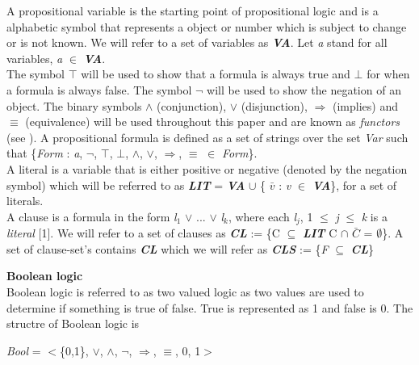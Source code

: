 \documentclass[11pt,a4paper]{report}
\begin{document}
A propositional variable is the starting point of propositional logic and is a alphabetic symbol that represents a object or number which is subject to change or is not known. We will refer to a set of variables as \textit{\textbf{VA}}. Let \textit{a} stand for all variables, \textit{a} $\in$ \textit{\textbf{VA}}.\\
The symbol $\top$ will be used to show that a formula is always true and $\bot$ for when a formula is always false. The symbol $\neg$ will be used to show the negation of an object. The binary symbols $\land$ (conjunction), $\lor$ (disjunction), $\Rightarrow$ (implies) and $\equiv$ (equivalence) will be used throughout this paper and are known as \textit{functors} (see \cite{Marek2009Introduction}). A propositional formula is defined as a set of strings over the set \textit{Var} such that \{\textit{Form} : \textit{a}, $\neg$, $\top$, $\bot$, $\land$, $\lor$, $\Rightarrow$, $\equiv$ $\in$ \textit{Form}\}. \\


A literal is a variable that is either positive or negative (denoted by the negation symbol) which will be referred to as \textbf{\textit{LIT}} =  \textit{\textbf{VA}} $\cup$ \{ \textit{$\bar{v}$} : \textit{v} $\in$ \textbf{\textit{VA}}\}, for a set of literals.\\

A clause is a formula in the form \textit{l$_1$} $\lor$ ... $\lor$ \textit{l$_k$}, where each \textit{l$_j$}, 1 $\le$ \textit{j} $\le$ \textit{k} is a \textit{literal} [1]. We will refer to a set of clauses as \textbf{\textit{CL}} := \{C $\subseteq$ \textbf{\textit{LIT}} C $\cap$ $\bar{C}$ = $\emptyset$\}. A set of clause-set's contains \textbf{\textit{CL}} which we will refer as \textbf{\textit{CLS}} := \{\textit{F} $\subseteq$ \textit{\textbf{CL}}\}  


\textbf{Boolean logic}\\
Boolean logic is referred to as two valued logic as two values are used to determine if something is true of false. True is represented as 1 and false is 0. The structre of Boolean logic is
\begin{center}
\textit{Bool} = $<$\{0,1\}, $\lor$, $\land$, $\neg$, $\Rightarrow$, $\equiv$, 0, 1$>$
\end{center}
\end{document}
